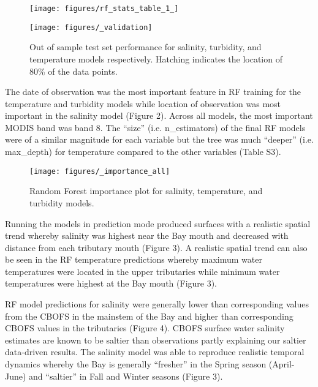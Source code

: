 \documentclass{article}
\begin{document}
\begin{figure}[ht!]
    \begin{center}
          \texttt{[image: figures/rf\_stats\_table\_1\_]}          
    \end{center}    
\end{figure}

\begin{figure}[ht!]
    \begin{center}
          \texttt{[image: figures/\_validation]}
          \caption{Out of sample test set performance for salinity, turbidity, and temperature models respectively. Hatching indicates the location of 80\% of the data points.}
    \end{center}    
\end{figure}

The date of observation was the most important feature in RF training for the temperature and turbidity models while location of observation was most important in the salinity model (Figure 2). Across all models, the most important MODIS band was band 8. The “size” (i.e. n\_estimators) of the final RF models were of a similar magnitude for each variable but the tree was much “deeper” (i.e. max\_depth) for temperature compared to the other variables (Table S3).

\begin{figure}[ht!]
    \begin{center}
          \texttt{[image: figures/\_importance\_all]}
          \caption{Random Forest importance plot for salinity, temperature, and turbidity models.}
    \end{center}    
\end{figure}

Running the models in prediction mode produced surfaces with a realistic spatial trend whereby salinity was highest near the Bay mouth and decreased with distance from each tributary mouth (Figure 3). A realistic spatial trend can also be seen in the RF temperature predictions whereby maximum water temperatures were located in the upper tributaries while minimum water temperatures were highest at the Bay mouth (Figure 3).

RF model predictions for salinity were generally lower than corresponding values from the CBOFS in the mainstem of the Bay and higher than corresponding CBOFS values in the tributaries (Figure 4). CBOFS surface water salinity estimates are known to be saltier than observations \citep{lanerolle2011second, vogelAssessingSatelliteSea2016} partly explaining our saltier data-driven results. The salinity model was able to reproduce realistic temporal dynamics whereby the Bay is generally “fresher” in the Spring season (April-June) and “saltier” in Fall and Winter seasons (Figure 3).
\end{document}

